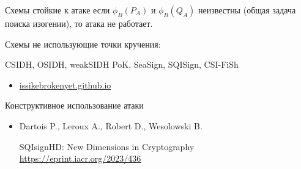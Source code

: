 \documentclass{beamer}
\begin{document}
\begin{frame}{Схемы стойкие к атаке}
	 если $\phi_B(P_A)$ и $\phi_B(Q_A)$ неизвестны (общая задача поиска изогении), то атака не работает.
	
	\vspace{1em}
	Схемы не использующие точки кручения:
	\vspace*{1em}
	
	CSIDH, OSIDH, weakSIDH PoK, SeaSign, SQISign, CSI-FiSh
	\vspace*{1em}
	\begin{itemize}
		\item[\structure{{\faGlobe}}] \href{https://issikebrokenyet.github.io/}{issikebrokenyet.github.io}
	\end{itemize}
\end{frame}

\begin{frame}{Конструктивное использование атаки}
	\begin{itemize}
	\item[\structure{{\faScroll}}] 
	Dartois P., Leroux A., Robert D., Wesolowski B.

	SQIsignHD: New Dimensions in Cryptography\\
	\url{https://eprint.iacr.org/2023/436}
\end{itemize}
\end{frame}
\end{document}
